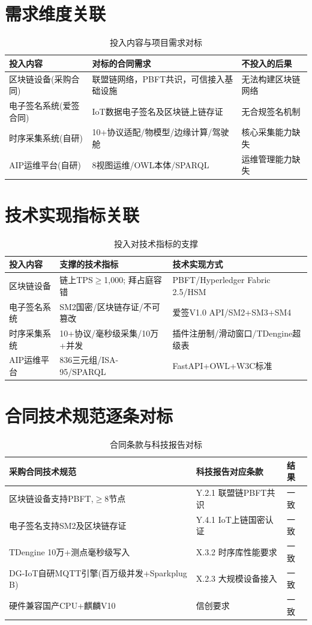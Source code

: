\documentclass[12pt,a4paper]{ctexart}
\begin{document}
\section{需求维度关联}
\begin{table}[H]\centering
\caption{投入内容与项目需求对标}
\begin{tabular}{@{}p{3cm}p{5cm}p{5cm}@{}}
\toprule
投入内容 & 对标的合同需求 & 不投入的后果 \\
\midrule
区块链设备(采购合同) & 联盟链网络，PBFT共识，可信接入基础设施 & 无法构建区块链网络 \\
电子签名系统(爱签合同) & IoT数据电子签名及区块链上链存证 & 无合规签名机制 \\
时序采集系统(自研) & 10+协议适配/物模型/边缘计算/驾驶舱 & 核心采集能力缺失 \\
AIP运维平台(自研) & 8视图运维/OWL本体/SPARQL & 运维管理能力缺失 \\
\bottomrule
\end{tabular}\end{table}

\section{技术实现指标关联}
\begin{table}[H]\centering
\caption{投入对技术指标的支撑}
\begin{tabular}{@{}p{3.5cm}p{5cm}p{5cm}@{}}
\toprule
投入内容 & 支撑的技术指标 & 技术实现方式 \\
\midrule
区块链设备 & 链上TPS$\ge$1,000; 拜占庭容错 & PBFT/Hyperledger Fabric 2.5/HSM \\
电子签名系统 & SM2国密/区块链存证/不可篡改 & 爱签V1.0 API/SM2+SM3+SM4 \\
时序采集系统 & 10+协议/毫秒级采集/10万+并发 & 插件注册制/滑动窗口/TDengine超级表 \\
AIP运维平台 & 836三元组/ISA-95/SPARQL & FastAPI+OWL+W3C标准 \\
\bottomrule
\end{tabular}\end{table}

\section{合同技术规范逐条对标}
\begin{table}[H]\centering
\caption{合同条款与科技报告对标}
\begin{tabular}{@{}p{4cm}p{4cm}p{3cm}@{}}
\toprule
采购合同技术规范 & 科技报告对应条款 & 结果 \\
\midrule
区块链设备支持PBFT,$\ge$8节点 & Y.2.1 联盟链PBFT共识 & 一致 \\
电子签名支持SM2及区块链存证 & Y.4.1 IoT上链国密认证 & 一致 \\
TDengine 10万+测点毫秒级写入 & X.3.2 时序库性能要求 & 一致 \\
DG-IoT自研MQTT引擎(百万级并发+Sparkplug B) & X.2.3 大规模设备接入 & 一致 \\
硬件兼容国产CPU+麒麟V10 & 信创要求 & 一致 \\
\bottomrule
\end{tabular}\end{table}
\end{document}
